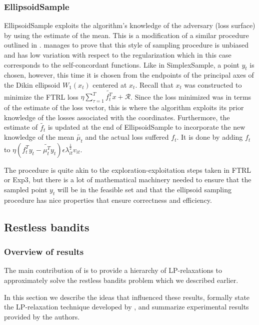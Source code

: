 \subsubsection{EllipsoidSample}
EllipsoidSample exploits the algorithm's knowledge of the adversary (loss surface) by using the estimate of the mean. This is a modification of a similar procedure outlined in \citep{abernethy}. \citep{abernethy} manages to prove that this style of sampling procedure is unbiased and has low variation with respect to the regularization which in this case corresponds to the self-concordant functions. Like in SimplexSample, a point $y_t$ is chosen, however, this time it is chosen from the endpoints of the principal axes of the Dikin ellipsoid $W_1(x_t)$ centered at $x_t$. Recall that $x_t$ was constructed to minimize the FTRL loss $\eta \sum_{\tau=1}^T\tilde{f_t^T}x +\mathcal{R}$. Since the loss minimized was in terms of the estimate of the loss vector, this is where the algorithm exploits its prior knowledge of the losses associated with the coordinates. Furthermore, the estimate of $\tilde{f_t}$ is updated at the end of EllipsoidSample to incorporate the new knowledge of the mean $\tilde{\mu_t}$ and the actual loss suffered $f_t$. It is done by adding $f_t$ to $\eta (f_{t}^Ty_t - \tilde{\mu_{t}^T}y_t)\epsilon \lambda_{it}^{\frac{1}{2}}v_{it}$.

The procedure is quite akin to the exploration-exploitation steps taken in FTRL or Exp3, but there is a lot of mathematical machinery needed to ensure that the sampled point $y_t$ will be in the feasible set and that the ellipsoid sampling procedure has nice properties that ensure correctness and efficiency. 



\subsection{Restless bandits}

\subsubsection{Overview of results}
The main contribution of \citep{bertsimas} is to provide a hierarchy of LP-relaxations
to approximately solve the restless bandits problem which we described earlier.

In this section we describe the ideas that influenced these results, formally state the LP-relaxation technique developed by \citep{bertsimas}, and  summarize experimental results provided by the authors.

